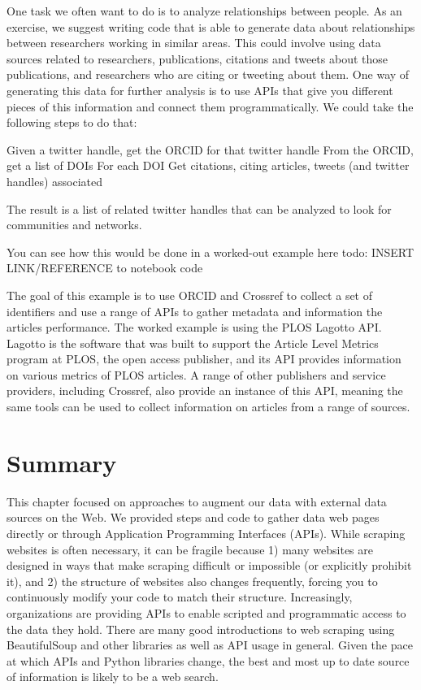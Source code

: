 \documentclass[]{krantz}
\begin{document}
One task we often want to do is to analyze relationships between people.
As an exercise, we suggest writing code that is able to generate data
about relationships between researchers working in similar areas. This
could involve using data sources related to researchers, publications,
citations and tweets about those publications, and researchers who are
citing or tweeting about them. One way of generating this data for
further analysis is to use APIs that give you different pieces of this
information and connect them programmatically. We could take the
following steps to do that:

Given a twitter handle, get the ORCID for that twitter handle From the
ORCID, get a list of DOIs For each DOI Get citations, citing articles,
tweets (and twitter handles) associated

The result is a list of related twitter handles that can be analyzed to
look for communities and networks.

You can see how this would be done in a worked-out example here todo:
INSERT LINK/REFERENCE to notebook code

The goal of this example is to use ORCID and Crossref to collect a set
of identifiers and use a range of APIs to gather metadata and
information the articles performance. The worked example is using the
PLOS Lagotto API. Lagotto is the software that was built to support the
Article Level Metrics program at PLOS, the open access publisher, and
its API provides information on various metrics of PLOS articles. A
range of other publishers and service providers, including Crossref,
also provide an instance of this API, meaning the same tools can be used
to collect information on articles from a range of sources.

\section{Summary}\label{sec:4-9}

This chapter focused on approaches to augment our data with external
data sources on the Web. We provided steps and code to gather data web
pages directly or through Application Programming Interfaces (APIs).
While scraping websites is often necessary, it can be fragile because 1)
many websites are designed in ways that make scraping difficult or
impossible (or explicitly prohibit it), and 2) the structure of websites
also changes frequently, forcing you to continuously modify your code to
match their structure. Increasingly, organizations are providing APIs to
enable scripted and programmatic access to the data they hold. There are
many good introductions to web scraping using BeautifulSoup and other
libraries as well as API usage in general. Given the pace at which APIs
and Python libraries change, the best and most up to date source of
information is likely to be a web search.
\end{document}

